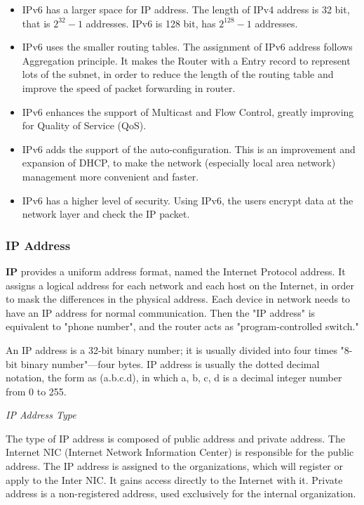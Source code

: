 \begin{itemize}
	\item IPv6 has a larger space for IP address. The length of IPv4 address is 32 bit, that is $ 2^{32} - 1 $ addresses. IPv6 is 128 bit, has $2^{128} - 1 $ addresses.
	\item IPv6 uses the smaller routing tables. The assignment of IPv6 address follows Aggregation principle. It makes the Router with a Entry record to represent lots of the subnet, in order to reduce the length of the routing table and improve the speed of packet forwarding in router.
	\item IPv6 enhances the support of Multicast and Flow Control, greatly improving for Quality of Service (QoS).
	\item IPv6 adds the support of the auto-configuration. This is an improvement and expansion of DHCP, to make the network (especially local area network) management more convenient and faster.
	\item IPv6 has a higher level of security. Using IPv6, the users encrypt data at the network layer and check the IP packet.
\end{itemize}

\subsubsection{IP Address}

\textbf{IP} provides a uniform address format, named the Internet Protocol address. It assigns a logical address for each network and each host on the Internet, in order to mask the differences in the physical address. Each device in network needs to have an IP address for normal communication. Then the "IP address" is equivalent to "phone number", and the router acts as "program-controlled switch."  

An IP address is a 32-bit binary number; it is usually divided into four times "8-bit binary number"---four bytes. IP address is usually the dotted decimal notation, the form as (a.b.c.d), in which a, b, c, d is a decimal integer number from 0 to 255.  

\textit{IP Address Type}

The type of IP address is composed of public address and private address.  
The Internet NIC (Internet Network Information Center) is responsible for the public address. The IP address is assigned to the organizations, which will register or apply to the Inter NIC. It gains access directly to the Internet with it. Private address is a non-registered address, used exclusively for the internal organization.  

